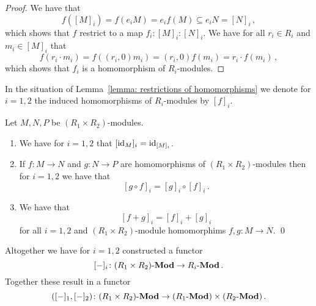 \begin{proof}
  We have that
  \[
              f([M]_i)
    =         f(e_i M)
    =         e_i f(M)
    \subseteq e_i N
    =         [N]_i \,,
  \]
  which shows that $f$ restrict to a map $f_i \colon [M]_i \colon [N]_i$.
  We have for all $r_i \in R_i$ and $m_i \in [M]_i$ that
  \[
      f(r_i \cdot m_i)
    = f((r_i,0) m_i)
    = (r_i,0) f(m_i)
    = r_i \cdot f(m_i) \,,
  \]
  which shows that $f_i$ is a homomorphism of $R_i$-modules.
\end{proof}


\begin{definition}
  In the situation of Lemma~\ref{lemma: restrictions of homomorphisms} we denote for $i = 1, 2$ the induced homomorphisms of $R_i$-modules by $[f]_i$.
\end{definition}


\begin{lemma}
  Let $M, N, P$ be $(R_1 \times R_2)$-modules.
  \begin{enumerate}
    \item
      We have for $i = 1, 2$ that $[\operatorname{id}_M]_i = \operatorname{id}_{[M]_i}$.
    \item
      If $f \colon M \to N$ and $g \colon N \to P$ are homomorphisms of $(R_1 \times R_2)$-modules then for $i = 1, 2$ we have that
      \[
          [g \circ f]_i
        = [g]_i \circ [f]_i \,.
      \]
    \item
      We have that
      \[
          [f + g]_i
        = [f]_i + [g]_i
      \]
      for all $i = 1, 2$ and $(R_1 \times R_2)$-module homomorphims $f, g \colon M \to N$.
    \qed
  \end{enumerate}
\end{lemma}


\begin{remark}
  \label{remark: functor into product}
  Altogether we have for $i = 1, 2$ constructed a functor
  \[
            [-]_i
    \colon  (R_1 \times R_2)\text{-}\mathbf{Mod}
    \to     R_i\text{-}\mathbf{Mod} \,.
  \]
  Together these result in a functor
  \[
            ([-]_1, [-]_2)
    \colon  (R_1 \times R_2)\text{-}\mathbf{Mod}
    \to     (R_1\text{-}\mathbf{Mod}) \times (R_2\text{-}\mathbf{Mod}) \,.
  \]
\end{remark}



